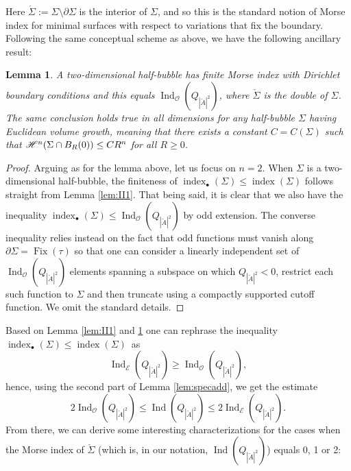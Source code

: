 \documentclass[10pt]{amsart}
\let\mathcal\mathscr
\newcounter{cas}
\newcommand{\sbullet}{{\scriptscriptstyle\bullet}}
\DeclareMathOperator{\Fix}{Fix}
\DeclareMathOperator{\indx}{index}
\DeclareMathOperator{\Ind}{Ind}
\newtheorem{lem}[thm]{Lemma}
\theoremstyle{definition}
\newcommand{\h}{\mathscr{H}}
\begin{document}
Here $\mathring{\Sigma}:=\Sigma\setminus\partial\Sigma$ is the interior of $\Sigma$, and so this is the standard notion of Morse index for minimal surfaces with respect to variations that fix the boundary. Following the same conceptual scheme as above, we have the following ancillary result:

\begin{lem}\label{lem:II2}
A two-dimensional half-bubble has finite Morse index \emph{with \hbox{Dirichlet} boundary conditions} and this equals $\Ind_{\mathcal{O}}(Q_{|\check{A}|^2})$, where $\check{\Sigma}$ is the double of $\Sigma$.
The same conclusion holds true in all dimensions for any half-bubble $\Sigma$ having \hbox{Euclidean} volume growth, meaning that there exists a constant $C=C(\Sigma)$ such that $\h^n(\Sigma\cap\nobreak B_R(0))\leq C R^n$ for all $R\geq 0$.
\end{lem}

\begin{proof}
Arguing as for the lemma above, let us focus on $n=2$. When $\Sigma$ is a two-dimensional half-bubble, the finiteness of $\indx_{\sbullet} (\Sigma)\leq \indx(\Sigma)$ follows straight from Lemma \ref{lem:II1}. That being said, it is clear that we also have the inequality
$\indx_{\sbullet} (\Sigma)\leq \Ind_{\mathcal{O}}(Q_{|\check{A}|^2})$ by odd extension. The converse inequality
relies instead on the fact that odd functions must vanish along $\partial\Sigma=\Fix(\tau)$ so that one can consider a linearly independent set of $\Ind_{\mathcal{O}}(Q_{|\check{A}|^2})$ elements spanning a subspace on which $Q_{|\check{A}|^2}<0$, restrict each such function to $\Sigma$ and then truncate using a compactly supported cutoff function. We omit the standard details.
\end{proof}

Based on Lemma \ref{lem:II1} and \ref{lem:II2} one can rephrase the inequality $\indx_{\sbullet} (\Sigma)\!\leq\!\indx(\Sigma)$~as
\begin{equation}\label{eq:EindexvsOindex}
\Ind_{\mathcal{E}}(Q_{|\check{A}|^2})\geq \Ind_{\mathcal{O}}(Q_{|\check{A}|^2}),
\end{equation}
hence, using the second part of Lemma \ref{lem:specadd}, we get the estimate
\begin{equation}\label{eq:fundineq}
2 \Ind_{\mathcal{O}}(Q_{|\check{A}|^2})\leq \Ind(Q_{|\check{A}|^2})\leq 2 \Ind_{\mathcal{E}}(Q_{|\check{A}|^2}).
\end{equation}
From there, we can derive some interesting characterizations for the cases when the Morse index of $\check{\Sigma}$ (which is, in our notation, $ \Ind(Q_{|\check{A}|^2})$) equals 0, 1 or 2:
\end{document}
